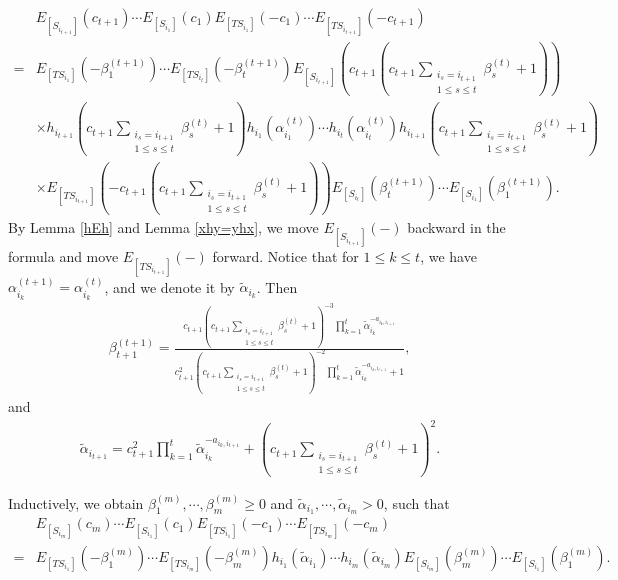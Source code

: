 \documentclass[12pt]{amsart}
\begin{document}
\begin{align*}
    &E_{[S_{i_{t+1}}]}(c_{t+1}) \cdots E_{[S_{i_1}]}(c_1)E_{[TS_{i_1}]}(-c_1)\cdots E_{[TS_{i_{t+1}}]}(-c_{t+1})\\
   =&  E_{[TS_{i_1}]}(-\beta_1^{(t+1)})\cdots E_{[TS_{i_t}]}(-\beta_t^{(t+1)})E_{[S_{i_{t+1}}]}(c_{t+1}(c_{t+1}\sum_{\substack{i_s=i_{t+1}\\1\leq s\leq t}} \beta_s^{(t)}+1))  \\
    &\times  h_{i_{t+1}}(c_{t+1}\sum_{\substack{i_s=i_{t+1}\\1\leq s\leq t}} \beta_s^{(t)}+1) h_{i_1}(\alpha_{i_1}^{(t)})\cdots h_{i_t}(\alpha_{i_t}^{(t)}) h_{i_{t+1}}(c_{t+1}\sum_{\substack{i_s=i_{t+1}\\1\leq s\leq t}} \beta_s^{(t)}+1) \\
    &\times E_{[TS_{i_{t+1}}]}(-c_{t+1}(c_{t+1}\sum_{\substack{i_s=i_{t+1}\\1\leq s\leq t}} \beta_s^{(t)}+1))  E_{[S_{i_t}]}(\beta_t^{(t+1)})\cdots E_{[S_{i_1}]}(\beta_1^{(t+1)}).
\end{align*}
By Lemma \ref{hEh} and Lemma \ref{xhy=yhx}, we move $E_{[S_{i_{t+1}}]}(-)$ backward in the formula and move $E_{[TS_{i_{t+1}}]}(-)$ forward.
Notice that for $1\leq k\leq t$, we have $\alpha_{i_k}^{(t+1)}=\alpha_{i_k}^{(t)}$, and we denote it by $\tilde{\alpha}_{i_k}$. 
Then 
\begin{align}\label{beta}
    \beta_{t+1}^{(t+1)}=\frac{c_{t+1} (c_{t+1}\sum_{\substack{i_s=i_{t+1}\\1\leq s\leq t}} \beta_s^{(t)}+1)^{-3} \prod_{k=1}^{t} \tilde{\alpha}_{i_k}^{-a_{i_k,i_{t+1}}} }{c_{t+1}^2 (c_{t+1}\sum_{\substack{i_s=i_{t+1}\\1\leq s\leq t}} \beta_s^{(t)}+1)^{-2} \prod_{k=1}^{t} \tilde{\alpha}_{i_k}^{-a_{i_k,i_{t+1}}}+1 },
\end{align}
and 
\begin{align}\label{alpha}
    \tilde{\alpha}_{i_{t+1}}=c_{t+1}^2 \prod_{k=1}^{t} \tilde{\alpha}_{i_k}^{-a_{i_k,i_{t+1}}} + (c_{t+1}\sum_{\substack{i_s=i_{t+1}\\1\leq s\leq t}} \beta_s^{(t)}+1)^2.
\end{align}

Inductively, we obtain $\beta_1^{(m)},\cdots,\beta_m^{(m)}\geq 0$ and $\tilde{\alpha}_{i_1},\cdots,\tilde{\alpha}_{i_m}>0$, such that 
\begin{align*}
    &E_{[S_{i_m}]}(c_m) \cdots E_{[S_{i_1}]}(c_1)E_{[TS_{i_1}]}(-c_1)\cdots E_{[TS_{i_m}]}(-c_m)\\
    =&E_{[TS_{i_1}]}(-\beta_1^{(m)})\cdots E_{[TS_{i_m}]}(-\beta_m^{(m)}) h_{i_1}(\tilde{\alpha}_{i_1})\cdots h_{i_m}(\tilde{\alpha}_{i_m}) E_{[S_{i_m}]}(\beta_m^{(m)}) \cdots E_{[S_{i_1}]}(\beta_1^{(m)}).
\end{align*}
\end{document}
